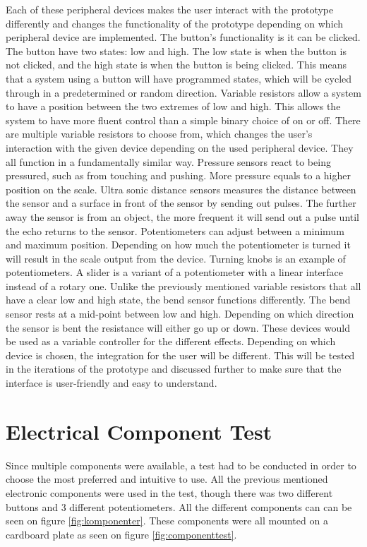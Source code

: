 Each of these peripheral devices makes the user interact with the prototype differently and changes the functionality of the prototype depending on which peripheral device are implemented.
The button's functionality is it can be clicked. The button have two states: low and high. The low state is when the button is not clicked, and the high state is when the button is being clicked. This means that a system using a button will have programmed states, which will be cycled through in a predetermined or random direction.
Variable resistors allow a system to have a position between the two extremes of low and high. This allows the system to have more fluent control than a simple binary choice of on or off. There are multiple variable resistors to choose from, which changes the user's interaction with the given device depending on the used peripheral device.  They all function in a fundamentally similar way. 
Pressure sensors react to being pressured, such as from touching and pushing. More pressure equals to a higher position on the scale.
Ultra sonic distance sensors measures the distance between the sensor and a surface in front of the sensor by sending out pulses. The further away the sensor is from an object, the more frequent it will send out a pulse until the echo returns to the sensor. 
Potentiometers can adjust between a minimum and maximum position. Depending on how much the potentiometer is turned it will result in the scale output from the device. Turning knobs is an example of potentiometers. A slider is a variant of a potentiometer with a linear interface instead of a rotary one.
Unlike the previously mentioned variable resistors that all have a clear low and high state, the bend sensor functions differently. The bend sensor rests at a mid-point between low and high. Depending on which direction the sensor is bent the resistance will either go up or down.
These devices would be used as a variable controller for the different effects. Depending on which device is chosen, the integration for the user will be different. This will be tested in the iterations of the prototype and discussed further to make sure that the interface is user-friendly and easy to understand. 



\section{Electrical Component Test}
Since multiple components were available, a test had to be conducted in order to choose the most preferred and intuitive to use. All the previous mentioned electronic components were used in the test, though there was two different buttons and 3 different potentiometers. All the different components can can be seen on figure \ref{fig:komponenter}. These components were all mounted on a cardboard plate as seen on figure \ref{fig:componenttest}.

